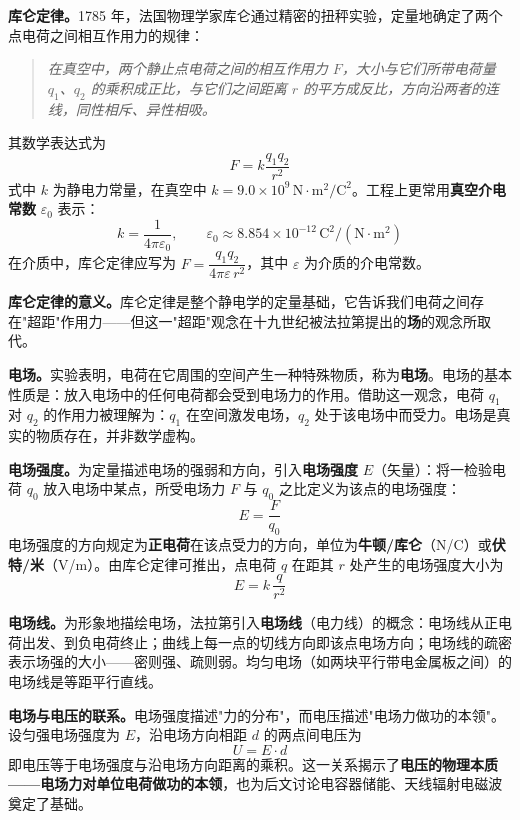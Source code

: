 \documentclass[12pt,UTF8]{ctexbook}
\begin{document}
\textbf{库仑定律。}1785 年，法国物理学家库仑通过精密的扭秤实验，定量地确定了两个点电荷之间相互作用力的规律：

\begin{quote}
\textit{在真空中，两个静止点电荷之间的相互作用力 $F$，大小与它们所带电荷量 $q_1$、$q_2$ 的乘积成正比，与它们之间距离 $r$ 的平方成反比，方向沿两者的连线，同性相斥、异性相吸。}
\end{quote}

其数学表达式为
\[
F = k\frac{q_1 q_2}{r^2}
\]
式中 $k$ 为静电力常量，在真空中 $k = 9.0 \times 10^{9}\,\mathrm{N\cdot m^2/C^2}$。工程上更常用\textbf{真空介电常数} $\varepsilon_0$ 表示：
\[
k = \frac{1}{4\pi\varepsilon_0}, \qquad \varepsilon_0 \approx 8.854 \times 10^{-12}\,\mathrm{C^2/(N\cdot m^2)}
\]
在介质中，库仑定律应写为 $F = \dfrac{q_1 q_2}{4\pi\varepsilon\, r^2}$，其中 $\varepsilon$ 为介质的介电常数。

\textbf{库仑定律的意义。}库仑定律是整个静电学的定量基础，它告诉我们电荷之间存在"超距"作用力——但这一"超距"观念在十九世纪被法拉第提出的\textbf{场}的观念所取代。

\textbf{电场。}实验表明，电荷在它周围的空间产生一种特殊物质，称为\textbf{电场}。电场的基本性质是：放入电场中的任何电荷都会受到电场力的作用。借助这一观念，电荷 $q_1$ 对 $q_2$ 的作用力被理解为：$q_1$ 在空间激发电场，$q_2$ 处于该电场中而受力。电场是真实的物质存在，并非数学虚构。

\textbf{电场强度。}为定量描述电场的强弱和方向，引入\textbf{电场强度} $E$（矢量）：将一检验电荷 $q_0$ 放入电场中某点，所受电场力 $F$ 与 $q_0$ 之比定义为该点的电场强度：
\[
E = \frac{F}{q_0}
\]
电场强度的方向规定为\textbf{正电荷}在该点受力的方向，单位为\textbf{牛顿/库仑}（N/C）或\textbf{伏特/米}（V/m）。由库仑定律可推出，点电荷 $q$ 在距其 $r$ 处产生的电场强度大小为
\[
E = k\,\frac{q}{r^2}
\]

\textbf{电场线。}为形象地描绘电场，法拉第引入\textbf{电场线}（电力线）的概念：电场线从正电荷出发、到负电荷终止；曲线上每一点的切线方向即该点电场方向；电场线的疏密表示场强的大小——密则强、疏则弱。均匀电场（如两块平行带电金属板之间）的电场线是等距平行直线。


\textbf{电场与电压的联系。}电场强度描述"力的分布"，而电压描述"电场力做功的本领"。设匀强电场强度为 $E$，沿电场方向相距 $d$ 的两点间电压为
\[
U = E \cdot d
\]
即电压等于电场强度与沿电场方向距离的乘积。这一关系揭示了\textbf{电压的物理本质——电场力对单位电荷做功的本领}，也为后文讨论电容器储能、天线辐射电磁波奠定了基础。
\end{document}
